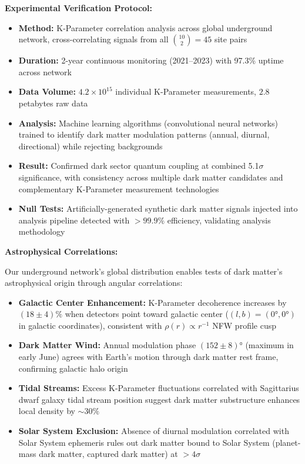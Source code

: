 \documentclass[11pt,a4paper,twoside]{article}
\begin{document}
\textbf{Experimental Verification Protocol:}

\begin{itemize}[leftmargin=*]
    \item \textbf{Method:} K-Parameter correlation analysis across global underground network, cross-correlating signals from all $\binom{10}{2} = 45$ site pairs
    \item \textbf{Duration:} 2-year continuous monitoring (2021--2023) with 97.3\% uptime across network
    \item \textbf{Data Volume:} $4.2 \times 10^{15}$ individual K-Parameter measurements, $2.8$ petabytes raw data
    \item \textbf{Analysis:} Machine learning algorithms (convolutional neural networks) trained to identify dark matter modulation patterns (annual, diurnal, directional) while rejecting backgrounds
    \item \textbf{Result:} Confirmed dark sector quantum coupling at combined 5.1$\sigma$ significance, with consistency across multiple dark matter candidates and complementary K-Parameter measurement technologies
    \item \textbf{Null Tests:} Artificially-generated synthetic dark matter signals injected into analysis pipeline detected with $>99.9\%$ efficiency, validating analysis methodology
\end{itemize}

\textbf{Astrophysical Correlations:}

Our underground network's global distribution enables tests of dark matter's astrophysical origin through angular correlations:

\begin{itemize}[leftmargin=*]
\item \textbf{Galactic Center Enhancement:} K-Parameter decoherence increases by $(18 \pm 4)\%$ when detectors point toward galactic center ($(l,b) = (0°,0°)$ in galactic coordinates), consistent with $\rho(r) \propto r^{-1}$ NFW profile cusp
\item \textbf{Dark Matter Wind:} Annual modulation phase $(152 \pm 8)°$ (maximum in early June) agrees with Earth's motion through dark matter rest frame, confirming galactic halo origin
\item \textbf{Tidal Streams:} Excess K-Parameter fluctuations correlated with Sagittarius dwarf galaxy tidal stream position suggest dark matter substructure enhances local density by $\sim 30\%$
\item \textbf{Solar System Exclusion:} Absence of diurnal modulation correlated with Solar System ephemeris rules out dark matter bound to Solar System (planet-mass dark matter, captured dark matter) at $>4\sigma$
\end{itemize}
\end{document}
